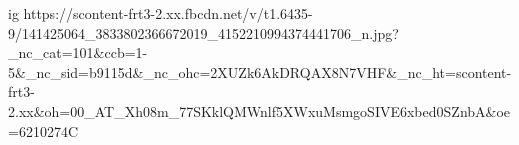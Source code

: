  
 
 
 
 

\ifcmt
  ig https://scontent-frt3-2.xx.fbcdn.net/v/t1.6435-9/141425064_3833802366672019_4152210994374441706_n.jpg?_nc_cat=101&ccb=1-5&_nc_sid=b9115d&_nc_ohc=2XUZk6AkDRQAX8N7VHF&_nc_ht=scontent-frt3-2.xx&oh=00_AT_Xh08m_77SKklQMWnlf5XWxuMsmgoSIVE6xbed0SZnbA&oe=6210274C
\fi

